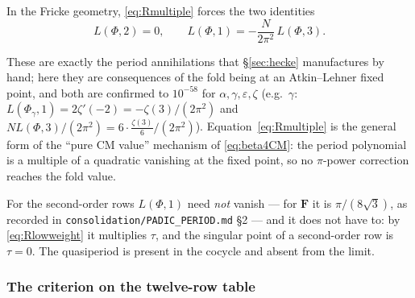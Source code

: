 \begin{corollary}\label{cor:forced}
\Proved{} In the Fricke geometry, \eqref{eq:Rmultiple} forces the two
identities
\[
L(\Phi,2)=0,\qquad L(\Phi,1)=-\frac{N}{2\pi^2}\,L(\Phi,3).
\]
\end{corollary}

\noindent
These are exactly the period annihilations that \S\ref{sec:hecke} manufactures
by hand; here they are consequences of the fold being at an Atkin--Lehner fixed
point, and both are confirmed to $10^{-58}$ for $\alpha,\gamma,\varepsilon,\zeta$
(e.g.\ $\gamma$: $L(\Phi_\gamma,1)=2\zeta'(-2)=-\zeta(3)/(2\pi^2)$ and
$NL(\Phi,3)/(2\pi^2)=6\cdot\tfrac{\zeta(3)}6/(2\pi^2)$).
Equation~\eqref{eq:Rmultiple} is the general form of the ``pure CM value''
mechanism of \eqref{eq:beta4CM}: the period polynomial is a multiple of a
quadratic vanishing at the fixed point, so no $\pi$-power correction reaches
the fold value.

\begin{remark}\label{rem:Lphi1}
For the second-order rows $L(\Phi,1)$ need \emph{not} vanish --- for $\mathbf F$
it is $\pi/(8\sqrt3)$, as recorded in \texttt{consolidation/PADIC\_PERIOD.md}
\S2 --- and it does not have to: by \eqref{eq:Rlowweight} it multiplies $\tau$,
and the singular point of a second-order row is $\tau=0$.  The quasiperiod is
present in the cocycle and absent from the limit.
\end{remark}

\subsubsection*{The criterion on the twelve-row table}

